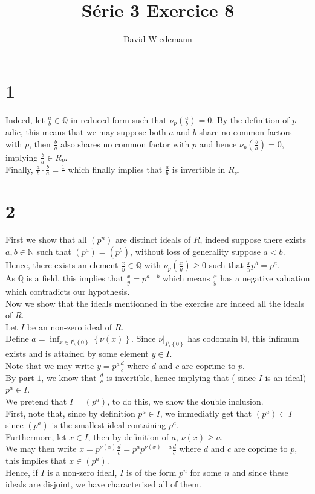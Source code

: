 \documentclass[11pt, a4paper]{article}
\begin{document}
\title{Série 3 Exercice 8}
\author{David Wiedemann}
\maketitle
\section*{1}
Indeed, let $\frac{a}{b}\in \mathbb{Q}$ in reduced form such that $\nu_p(\frac{a}{b} )=0 $. By the definition of $p$-adic, this means that we may suppose both $a$ and $b$ share no common factors with $p$, then $\frac{b}{a}$ also shares no common factor with $p$ and hence $\nu_p( \frac{b}{a}) =0$, implying $ \frac{b}{a}\in R_\nu$.\\
Finally, $\frac{a}{b}\cdot \frac{b}{a}= \frac{1}{1}$ which finally implies that $\frac{a}{b}$ is invertible in $R_\nu$.
\section*{2}
First we show that all $( p^{n}) $ are distinct ideals of $ R$, indeed suppose there exists $a,b \in \mathbb{N}$ such that $ ( p^{a}) = ( p^{b} )$, without loss of generality suppose $a<b$.\\
Hence, there exists an element $ \frac{x}{y} \in \mathbb{Q}$ with $ \nu_p( \frac{x}{y} ) \geq 0$ such that $ \frac{x}{y}p^{b} = p^{a} $.\\
As $ \mathbb{Q}$ is a field, this implies that $ \frac{x}{y}= p^{a-b}$ which means $ \frac{x}{y}$ has a negative valuation which contradicts our hypothesis.\\

Now we show that the ideals mentionned in the exercise are indeed all the ideals of $ R$.\\
Let $I$ be an non-zero ideal of $ R$.\\
Define $ a = \inf_{x \in I\setminus \left\{ 0 \right\} 	} \left\{ \nu( x)  \right\} $. Since $\nu\vert_{I \setminus \left\{ 0 \right\} }  $ has codomain $ \mathbb{N}$, this infimum exists and is attained by some element $y \in I$.\\
Note that we may write $ y = p^{a} \frac{d}{c}$ where $d$ and $c$ are coprime to $p$.\\
By part $1$, we know that $\frac{d}{c}$ is invertible, hence implying that ( since $I$ is an ideal) $p^{a}\in I$.\\

We pretend that $ I = ( p^{a}) $, to do this, we show the double inclusion.\\
First, note that, since by definition $ p^{a}\in I$, we immediatly get that $ ( p^{a}) \subset I$ since $( p^{a}) $ is the smallest ideal containing $ p^{a}$.\\
Furthermore, let $x \in I$, then by definition of $a$, $\nu( x) \geq a$.\\
We may then write $x = p^{\nu( x) }\frac{d}{c} = p^{a} p^{\nu( x) -a}\frac{d}{c}$ where $d$ and $c$ are coprime to $p$, this implies that $x\in ( p^{a}) $.\\
Hence, if $I$ is a  non-zero ideal, $I$ is of the form $p^{n}$ for some $n$ and since these ideals are disjoint, we have characterised all of them.
\end{document}

